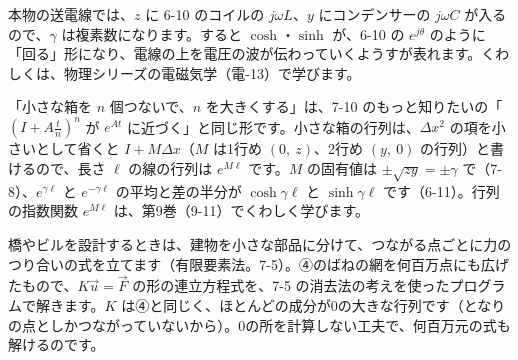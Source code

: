 本物の送電線では、$z$ に 6-10 のコイルの $j\omega L$、$y$ にコンデンサーの $j\omega C$ が入るので、$\gamma$ は複素数になります。すると $\cosh$・$\sinh$ が、6-10 の $e^{j\theta}$ のように「回る」形になり、電線の上を電圧の波が伝わっていくようすが表れます。くわしくは、物理シリーズの電磁気学（電-13）で学びます。

\begin{seikaku}
「小さな箱を $n$ 個つないで、$n$ を大きくする」は、7-10 のもっと知りたいの「$\left(I+A\frac{t}{n}\right)^n$ が $e^{At}$ に近づく」と同じ形です。小さな箱の行列は、$\Delta x^2$ の項を小さいとして省くと $I+M\Delta x$（$M$ は1行め $(0,\ z)$、2行め $(y,\ 0)$ の行列）と書けるので、長さ $\ell$ の線の行列は $e^{M\ell}$ です。$M$ の固有値は $\pm\sqrt{zy}=\pm\gamma$ で（7-8）、$e^{\gamma\ell}$ と $e^{-\gamma\ell}$ の平均と差の半分が $\cosh\gamma\ell$ と $\sinh\gamma\ell$ です（6-11）。行列の指数関数 $e^{M\ell}$ は、第9巻（9-11）でくわしく学びます。
\end{seikaku}



\label{bk:7-11:tatemono}橋やビルを設計するときは、建物を小さな部品に分けて、つながる点ごとに力のつり合いの式を立てます（有限要素法。7-5）。④のばねの網を何百万点にも広げたもので、$K\vec u=\vec F$ の形の連立方程式を、7-5 の消去法の考えを使ったプログラムで解きます。$K$ は④と同じく、ほとんどの成分が0の大きな行列です（となりの点としかつながっていないから）。0の所を計算しない工夫で、何百万元の式も解けるのです。

